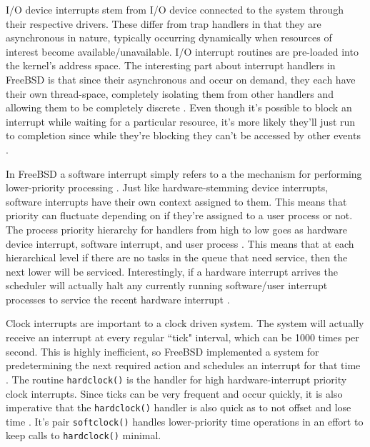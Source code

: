 \documentclass[10pt,draftclsnofoot,onecolumn]{IEEEtran}
\begin{document}
\par I/O device interrupts stem from I/O device connected to the system through their respective drivers.
These differ from trap handlers in that they are asynchronous in nature, typically occurring dynamically when resources of interest become available/unavailable.
I/O interrupt routines are pre-loaded into the kernel's address space.
The interesting part about interrupt handlers in FreeBSD is that since their asynchronous and occur on demand, they each have their own thread-space, completely isolating them from other handlers and allowing them to be completely discrete \cite{bsd:1}.
Even though it's possible to block an interrupt while waiting for a particular resource, it's more likely they'll just run to completion since while they're blocking they can't be accessed by other events \cite{bsd:1}.

\par In FreeBSD a software interrupt simply refers to a the mechanism for performing lower-priority processing \cite{bsd:1}.
Just like hardware-stemming device interrupts, software interrupts have their own context assigned to them.
This means that priority can fluctuate depending on if they're assigned to a user process or not.
The process priority hierarchy for handlers from high to low goes as hardware device interrupt, software interrupt, and user process \cite{bsd:1}.
This means that at each hierarchical level if there are no tasks in the queue that need service, then the next lower will be serviced.
Interestingly, if a hardware interrupt arrives the scheduler will actually halt any currently running software/user interrupt processes to service the recent hardware interrupt \cite{bsd:1}.

\par Clock interrupts are important to a clock driven system.
The system will actually receive an interrupt at every regular ``tick" interval, which can be 1000 times per second.
This is highly inefficient, so FreeBSD implemented a system for predetermining the next required action and schedules an interrupt for that time \cite{bsd:1}.
The routine \texttt{hardclock()} is the handler for high hardware-interrupt priority clock interrupts.
Since ticks can be very frequent and occur quickly, it is also imperative that the \texttt{hardclock()} handler is also quick as to not offset and lose time \cite{bsd:1}.
It's pair \texttt{softclock()} handles lower-priority time operations in an effort to keep calls to \texttt{hardclock()} minimal.
\end{document}
